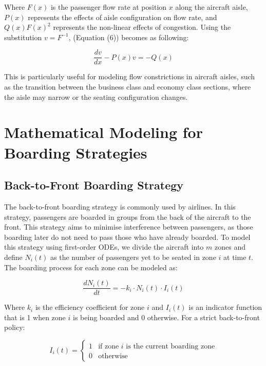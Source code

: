 \documentclass[12pt]{article}
\begin{document}
Where $F(x)$ is the passenger flow rate at position $x$ along the aircraft aisle, $P(x)$ represents the effects of aisle configuration on flow rate, and $Q(x)F(x)^2$ represents the non-linear effects of congestion. Using the substitution $v = F^{-1}$, (Equation (6)) becomes as following:

\begin{equation}
\frac{dv}{dx} - P(x)v = -Q(x)
\end{equation}

This is particularly useful for modeling flow constrictions in aircraft aisles, such as the transition between the business class and economy class sections, where the aisle may narrow or the seating configuration changes.

\section{Mathematical Modeling for Boarding Strategies}
\subsection{Back-to-Front Boarding Strategy}

The back-to-front boarding strategy is commonly used by airlines. In this strategy, passengers are boarded in groups from the back of the aircraft to the front. This strategy aims to minimise interference between passengers, as those boarding later do not need to pass those who have already boarded. To model this strategy using first-order ODEs, we divide the aircraft into $m$ zones and define $N_i(t)$ as the number of passengers yet to be seated in zone $i$ at time $t$. The boarding process for each zone can be modeled as:

\begin{equation}
\frac{dN_i(t)}{dt} = -k_i \cdot N_i(t) \cdot I_i(t)
\end{equation}

Where $k_i$ is the efficiency coefficient for zone $i$ and $I_i(t)$ is an indicator function that is 1 when zone $i$ is being boarded and 0 otherwise. For a strict back-to-front policy:

\begin{equation}
I_i(t) = 
\begin{cases}
1 & \text{if zone $i$ is the current boarding zone} \\
0 & \text{otherwise}
\end{cases}
\end{equation}
\end{document}
